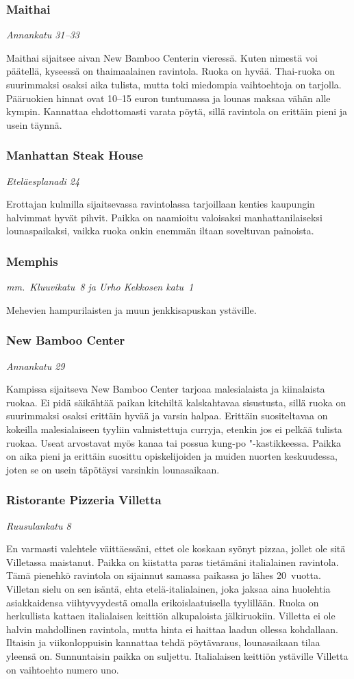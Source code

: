 \documentclass[../ala_hataile.tex]{subfiles}
\begin{document}
\subsubsection*{Maithai}
\textit{Annankatu 31--33}

Maithai sijaitsee aivan New Bamboo
Centerin vieressä. Kuten nimestä voi päätellä,
kyseessä on thaimaalainen ravintola. Ruoka on hyvää. Thai-ruoka on suurimmaksi
osaksi aika tulista, mutta toki miedompia
vaihtoehtoja on tarjolla. Pääruokien
hinnat ovat 10--15 euron tuntumassa ja lounas
maksaa vähän alle kympin. Kannattaa
ehdottomasti varata pöytä, sillä
ravintola on erittäin pieni ja usein täynnä.
\subsubsection*{Manhattan Steak House}
\textit{Eteläesplanadi 24}

Erottajan kulmilla sijaitsevassa ravintolassa
tarjoillaan kenties kaupungin halvimmat
hyvät pihvit. Paikka on naamioitu valoisaksi
manhattanilaiseksi lounaspaikaksi,
vaikka ruoka onkin enemmän iltaan soveltuvan
painoista.
\subsubsection*{Memphis}
\textit{mm.~Kluuvikatu~8 ja Urho Kekkosen katu~1}

Mehevien hampurilaisten ja muun
jenkkisapuskan
ystäville.
\subsubsection*{New Bamboo Center}
\textit{Annankatu 29}

Kampissa sijaitseva New Bamboo
Center tarjoaa malesialaista ja kiinalaista
ruokaa. Ei pidä säikähtää paikan kitchiltä
kalskahtavaa sisustusta, sillä ruoka on suurimmaksi
osaksi erittäin hyvää ja varsin
halpaa. Erittäin suositeltavaa on kokeilla
malesialaiseen tyyliin valmistettuja curryja,
etenkin jos ei pelkää tulista ruokaa.
Useat arvostavat myös kanaa tai possua
kung-po "-kastikkeessa. Paikka on aika pieni
ja erittäin
suosittu opiskelijoiden ja muiden
nuorten keskuudessa, joten se on usein täpötäysi
varsinkin lounasaikaan.
\subsubsection*{Ristorante Pizzeria Villetta}
\textit{Ruusulankatu 8}

En varmasti valehtele väittäessäni, ettet
ole koskaan syönyt pizzaa, jollet ole sitä
Villetassa maistanut. Paikka on kiistatta
paras tietämäni italialainen ravintola. Tämä
pienehkö ravintola on sijainnut samassa
paikassa jo lähes 20~vuotta. Villetan sielu
on sen isäntä, ehta etelä-italialainen, joka
jaksaa aina huolehtia asiakkaidensa viihtyvyydestä
omalla erikoislaatuisella tyylillään.
Ruoka on herkullista kattaen italialaisen
keittiön alkupaloista jälkiruokiin.
Villetta ei ole halvin mahdollinen ravintola,
mutta hinta ei haittaa laadun ollessa kohdallaan.
Iltaisin ja viikonloppuisin kannattaa
tehdä pöytävaraus, lounasaikaan tilaa
yleensä on. Sunnuntaisin paikka on suljettu.
Italialaisen keittiön ystäville Villetta on
vaihtoehto numero uno.
\end{document}
